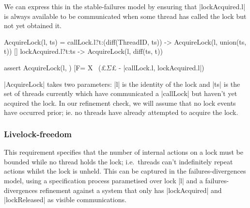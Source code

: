   
  

  We can express this in the stable-failures model by ensuring that |lockAcquired.l| is always available to be communicated when some thread has called the lock but not yet obtained it.

  \begin{cspm}
    AcquireLock(l, ts) = 
         callLock.l?t:(diff(ThreadID, ts)) -> AcquireLock(l, union(ts, {t}))
      [] lockAcquired.l?t:ts -> AcquireLock(l, diff(ts, {t}))

    assert AcquireLock(l, {}) [F= 
        X \ (£$\Sigma$£ - {|callLock.l, lockAcquired.l|})
  \end{cspm}
  |AcquireLock| takes two parameters: |l| is the identity of the lock and |ts| is the set of threads currently which have communicated a |callLock| but haven't yet acquired the lock. In our refinement check, we will assume that no lock events have occurred prior; ie. no threads have already attempted to acquire the lock. %

\subsubsection{Livelock-freedom}\label{livelock-freedom}
This requirement specifies that the number of internal actions on a lock must be bounded while no thread holds the lock; i.e.~threads can't indefinitely repeat actions whilst the lock is unheld. This can be captured in the failures-divergences model, using a specification process parametised over lock |l| and a failures-divergences refinement against a system that only has |lockAcquired| and |lockReleased| as visible communications.


